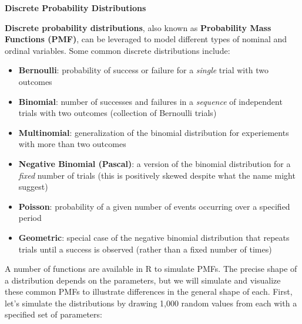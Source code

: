 \documentclass[]{book}
\providecommand{\tightlist}{%
  \setlength{\itemsep}{0pt}\setlength{\parskip}{0pt}}
\begin{document}
\textbf{Discrete Probability Distributions}

\textbf{Discrete probability distributions}, also known as \textbf{Probability Mass Functions (PMF)}, can be leveraged to model different types of nominal and ordinal variables. Some common discrete distributions include:

\begin{itemize}
\tightlist
\item
  \textbf{Bernoulli}: probability of success or failure for a \emph{single} trial with two outcomes
\item
  \textbf{Binomial}: number of successes and failures in a \emph{sequence} of independent trials with two outcomes (collection of Bernoulli trials)
\item
  \textbf{Multinomial}: generalization of the binomial distribution for experiements with more than two outcomes
\item
  \textbf{Negative Binomial (Pascal)}: a version of the binomial distribution for a \emph{fixed} number of trials (this is positively skewed despite what the name might suggest)
\item
  \textbf{Poisson}: probability of a given number of events occurring over a specified period
\item
  \textbf{Geometric}: special case of the negative binomial distribution that repeats trials until a success is observed (rather than a fixed number of times)
\end{itemize}

A number of functions are available in R to simulate PMFs. The precise shape of a distribution depends on the parameters, but we will simulate and visualize these common PMFs to illustrate differences in the general shape of each. First, let's simulate the distributions by drawing 1,000 random values from each with a specified set of parameters:
\end{document}
